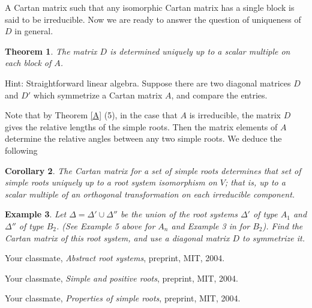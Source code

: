 \documentclass[11pt]{amsart}
\newtheorem{theorem}{Theorem}
\newtheorem{corollary}[theorem]{Corollary}
\newtheorem{example}[theorem]{Example}
\begin{document}
A Cartan matrix such that any isomorphic Cartan
matrix has a single block
is said to be irreducible. 
Now we are ready to answer the question of uniqueness of $D$ in general. 
\begin{theorem} \label{D} 
The matrix $D$ is determined uniquely up to a scalar 
multiple on each block of $A$.
\end{theorem} 

Hint: Straightforward linear algebra. 
Suppose there are two diagonal matrices $D$ and $D'$ which 
symmetrize a Cartan matrix $A$, and compare the entries. 

Note that by Theorem \ref{A} (5), 
in the case that $A$ is irreducible, the matrix 
$D$ gives   
the relative lengths of the simple roots. Then the matrix elements 
of $A$ determine the relative angles between any two simple roots. We deduce 
the following 

\begin{corollary} The Cartan matrix for a set of simple roots determines 
that set of simple roots 
uniquely up to a root system isomorphism on $V$;
that is, up to a scalar multiple of an orthogonal transformation 
on each irreducible component.
\end{corollary} 

\begin{example} Let $\Delta = \Delta' \cup \Delta''$ be the union of 
the root systems $\Delta'$ of type $A_1$ and $\Delta''$ of type $B_2$.
(See Example 5 above for $A_n$ and Example 3 in \cite{3} for $B_2$). 
Find the Cartan matrix of this root system, and use a diagonal 
matrix $D$ to symmetrize it. 
\end{example} 


\begin{thebibliography}{2}

 Your classmate, {\it Abstract root systems}, 
preprint, MIT, 2004. 

 Your classmate, {\it Simple and positive roots},
preprint, MIT, 2004.

 Your classmate, {\it Properties of simple roots},
preprint, MIT, 2004.

\end{thebibliography}
\end{document}
